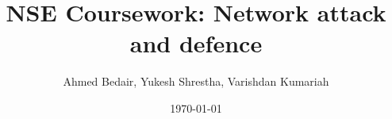 \documentclass[12pt]{informatics-report}
\title{NSE Coursework: Network attack and defence}
\author{Ahmed Bedair, Yukesh Shrestha, Varishdan Kumariah}
\date{\today}
\begin{document}
\createFrontMatter%
\onehalfspacing%
\tableofcontents
\doublespacing%






\end{document}
